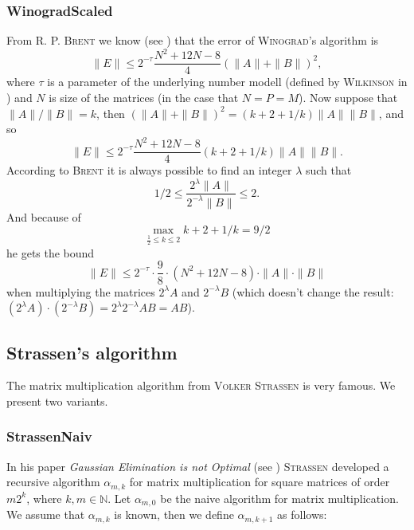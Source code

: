 \documentclass{amsart}
\newcommand{\CODE}[2]{}
\begin{document}
\subsubsection{WinogradScaled} From \textsc{R. P. Brent} we know (see \cite{brent}) that the error of \textsc{Winograd}'s algorithm is
\[
\|E\|\leq 2^{-\tau}\frac{N^2+12N-8}{4}(\|A\|+\|B\|)^2,
\]
where $\tau$ is a parameter of the underlying number modell (defined by \textsc{Wilkinson} in \cite{wilk}) and $N$ is size of the matrices (in the case that $N=P=M$). 
Now suppose that $\|A\|/\|B\| = k$, then $(\|A\|+\|B\|)^2 = (k+2+1/k)\|A\|\|B\|$, and so
\[
\|E\|\leq 2^{-\tau}\frac{N^2+12N-8}{4}(k+2+1/k)\|A\|\|B\|.
\]
According to \textsc{Brent} it is always possible to find an integer $\lambda$ such that
\[
1/2 \leq \frac{2^\lambda \|A\|}{2^{-\lambda}\|B\|} \leq 2.
\]
And because of
\[\max_{\frac12\leq k \leq 2} k+2+1/k=9/2\]
he gets the bound
\[
\|E\|\leq 2^{-\tau}\cdot \frac98 \cdot (N^2+12N-8)\cdot \|A\|\cdot\|B\|
\]
when multiplying the matrices $2^\lambda A$ and $2^{-\lambda}B$ (which doesn't change the result: $(2^\lambda A) \cdot (2^{-\lambda}B) = 2^\lambda 2^{-\lambda} A B=AB$).
\CODE{WinogradScaled.c}{7}





























\subsection{Strassen's algorithm}

The matrix multiplication algorithm from \textsc{Volker Strassen} is very famous. We present two variants.

\subsubsection{StrassenNaiv} In his paper \emph{Gaussian Elimination is not Optimal} (see \cite{strassen}) \textsc{Strassen} developed a recursive algorithm $\alpha_{m,k}$ for matrix multiplication for square matrices of order $m2^k$, where $k,m\in\mathbb N$. Let $\alpha_{m,0}$ be the naive algorithm for matrix multiplication. We assume that $\alpha_{m,k}$ is known, then we define $\alpha_{m,k+1}$ as follows:
\end{document}
